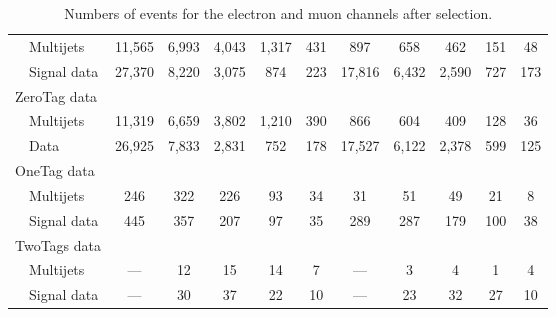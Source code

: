 \begin{table}[!h!tbp]
\begin{center}
\begin{minipage}{6.5 in}
\begin{ruledtabular}
\begin{tabular}{l||ccccc|ccccc}
~~Multijets              &  11,565 &  6,993 &  4,043 &  1,317 &    431 &     897 &    658 &    462 &    151 &    48 \\
~~Signal data            &  27,370 &  8,220 &  3,075 &    874 &    223 &  17,816 &  6,432 &  2,590 &    727 &   173 \\
ZeroTag data             &         &        &        &        &        &         &        &        &        &       \\
~~Multijets              &  11,319 &  6,659 &  3,802 &  1,210 &    390 &     866 &    604 &    409 &    128 &    36 \\
~~Data                   &  26,925 &  7,833 &  2,831 &    752 &    178 &  17,527 &  6,122 &  2,378 &    599 &   125 \\
OneTag data              &         &        &        &        &        &         &        &        &        &       \\
~~Multijets              &     246 &    322 &    226 &     93 &     34 &      31 &     51 &     49 &     21 &     8 \\
~~Signal data            &     445 &    357 &    207 &     97 &     35 &     289 &    287 &    179 &    100 &    38 \\
TwoTags data             &         &        &        &        &        &         &        &        &        &       \\
~~Multijets              &     --- &     12 &     15 &     14 &      7 &     --- &      3 &      4 &      1 &     4 \\
~~Signal data            &     --- &     30 &     37 &     22 &     10 &     --- &     23 &     32 &     27 &    10 
\end{tabular}
\end{ruledtabular} 
\vspace{-0.1in}
\caption[numbersofevents]{Numbers of events for the electron and muon
channels after selection.}
\label{numbers-of-events}
\end{minipage}
\end{center}
\end{table}



